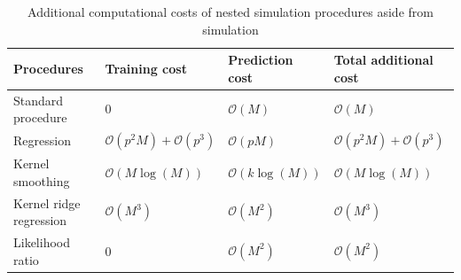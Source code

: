\begin{table}[ht]
    \centering  
    \small
    \begin{tabular}{llll}
    \hline
    \textbf{Procedures}      & \textbf{Training cost}                    &  \textbf{Prediction cost}    & \textbf{Total additional cost} \\ \hline \hline
    Standard procedure       &  $0$                                      &  $\mathcal{O}(M)$            & $\mathcal{O}(M)$ \\ 
    Regression               &  $\mathcal{O}(p^2M) + \mathcal{O}(p^3)$   &  $\mathcal{O}(pM)$           & $\mathcal{O}(p^2M) + \mathcal{O}(p^3)$ \\
    Kernel smoothing         &  $\mathcal{O}(M\log(M))$                  &  $\mathcal{O}(k\log(M))$     & $\mathcal{O}(M\log(M))$ \\
    Kernel ridge regression  &  $\mathcal{O}(M^3)$                       &  $\mathcal{O}(M^2)$          & $\mathcal{O}(M^3)$ \\
    Likelihood ratio         &  $0$                                      &  $\mathcal{O}(M^2)$          & $\mathcal{O}(M^2)$ \\
    \hline
    \end{tabular} 
    \caption{Additional computational costs of nested simulation procedures aside from simulation}
    \label{tab1:complexity}
\end{table}

